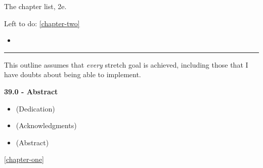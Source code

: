 The chapter list, 2e.

Left to do: \autoref{chapter-two}

\begin{itemize}
\tightlist
\item
\end{itemize}

\begin{center}\rule{0.5\linewidth}{0.5pt}\end{center}

This outline assumes that \emph{every} stretch goal is achieved,
including those that I have doubts about being able to implement.

\textbf{39.0 - Abstract}

\begin{itemize}
\tightlist
\item
  (Dedication)
\item
  (Acknowledgments)
\item
  (Abstract)
\end{itemize}

\autoref{chapter-one}

